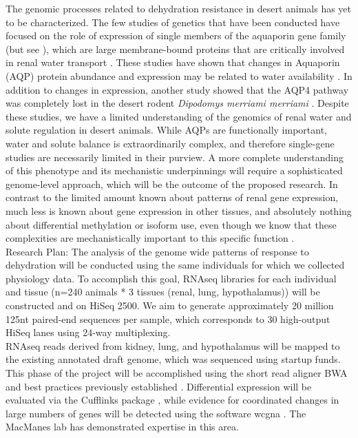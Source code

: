 The genomic processes related to dehydration resistance in desert animals has yet to be characterized. The few studies of genetics that have been conducted have focused on the role of expression of single members of the aquaporin gene family (but see \cite{Bartolo:2007hy}), which are large membrane-bound proteins that are critically involved in renal water transport \citep{Kwon:2009bv,Verkman:2002ww,Brown:1995vo,Nielsen:1995cb}. These studies have shown that changes in Aquaporin (AQP) protein abundance and expression may be related to water availability \citep{Boselt:2009fb, Gallardo:2005fm,Bozinovic:2003eg}. In addition to changes in expression, another study showed that the AQP4 pathway was completely lost in the desert rodent \textit{Dipodomys merriami merriami} \citep{Huang:2001ti}. Despite these studies, we have a limited understanding of the genomics of renal water and solute regulation in desert animals. While AQPs are functionally important, water and solute balance is extraordinarily complex, and therefore single-gene studies are necessarily limited in their purview. A more complete understanding of this phenotype and its mechanistic underpinnings will require a sophisticated genome-level approach, which will be the outcome of the proposed research. In contrast to the limited amount known about patterns of renal gene expression, much less is known about gene expression in other tissues, and absolutely nothing about differential methylation or isoform use, even though we know that these complexities are mechanistically important to this specific function \citep{Yukutake:2010ia,Silberstein:2004ex}. \\

Research Plan: The analysis of the genome wide patterns of response to dehydration will be conducted using the same individuals for which we collected physiology data. To accomplish this goal, RNAseq libraries for each individual and tissue (n=240 animals * 3 tissues (renal, lung, hypothalamus)) will be constructed and on HiSeq 2500. We aim to generate approximately 20 million 125nt paired-end sequences per sample, which corresponds to 30 high-output HiSeq lanes using 24-way multiplexing. \\ 

RNAseq reads derived from kidney, lung, and hypothalamus will be mapped to the existing annotated draft genome, which was sequenced using startup funds. This phase of the project will be accomplished using the short read aligner BWA \citep{Li:2013wn} and best practices previously established \citep{MacManes:2014io}. Differential expression will be evaluated via the Cufflinks package \citep{Trapnell:2012kp}, while evidence for coordinated changes in large numbers of genes will be detected using the software wcgna \citep{Langfelder:2008bd}. The MacManes lab has demonstrated expertise in this area. \\

